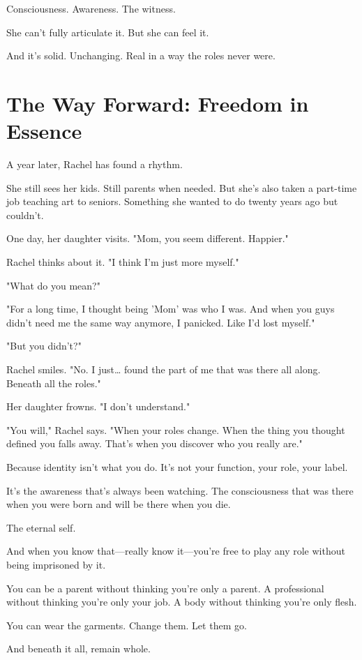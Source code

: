 \documentclass[11pt,twoside]{book}
\begin{document}
Consciousness. Awareness. The witness.

She can't fully articulate it. But she can feel it.

And it's solid. Unchanging. Real in a way the roles never were.

\section*{The Way Forward: Freedom in Essence}

A year later, Rachel has found a rhythm.

She still sees her kids. Still parents when needed. But she's also taken a part-time job teaching art to seniors. Something she wanted to do twenty years ago but couldn't.

One day, her daughter visits. "Mom, you seem different. Happier."

Rachel thinks about it. "I think I'm just more myself."

"What do you mean?"

"For a long time, I thought being 'Mom' was who I was. And when you guys didn't need me the same way anymore, I panicked. Like I'd lost myself."

"But you didn't?"

Rachel smiles. "No. I just\ldots{} found the part of me that was there all along. Beneath all the roles."

Her daughter frowns. "I don't understand."

"You will," Rachel says. "When your roles change. When the thing you thought defined you falls away. That's when you discover who you really are."

Because identity isn't what you do. It's not your function, your role, your label.

It's the awareness that's always been watching. The consciousness that was there when you were born and will be there when you die.

The eternal self.

And when you know that—really know it—you're free to play any role without being imprisoned by it.

You can be a parent without thinking you're only a parent. A professional without thinking you're only your job. A body without thinking you're only flesh.

You can wear the garments. Change them. Let them go.

And beneath it all, remain whole.
\end{document}
